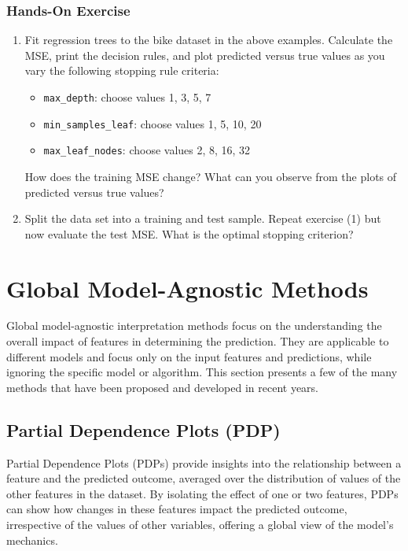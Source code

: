 \begin{tcolorbox}[colback=code]
\subsubsection*{Hands-On Exercise} 

\begin{enumerate}
\item Fit regression trees to the bike dataset in the above examples. Calculate the MSE, print the decision rules, and plot predicted versus true values as you vary the following stopping rule criteria:
\begin{itemize}
   \item \texttt{max\_depth}: choose values 1, 3, 5, 7
   \item \texttt{min\_samples\_leaf}: choose values 1, 5, 10, 20
   \item \texttt{max\_leaf\_nodes}: choose values 2, 8, 16, 32
\end{itemize}
How does the training MSE change? What can you observe from the plots of predicted versus true values?

\item Split the data set into a training and test sample. Repeat exercise (1) but now evaluate the test MSE. What is the optimal stopping criterion?
\end{enumerate}
\end{tcolorbox}

\section{Global Model-Agnostic Methods}

Global model-agnostic interpretation methods focus on the understanding the overall impact of features in determining the prediction. They are applicable to different models and focus only on the input features and predictions, while ignoring the specific model or algorithm. This section presents a few of the many methods that have been proposed and developed in recent years. 

\subsection{Partial Dependence Plots (PDP)}

Partial Dependence Plots (PDPs) provide insights into the relationship between a feature and the predicted outcome, averaged over the distribution of values of the other features in the dataset. By isolating the effect of one or two features, PDPs can show how changes in these features impact the predicted outcome, irrespective of the values of other variables, offering a global view of the model's mechanics.

